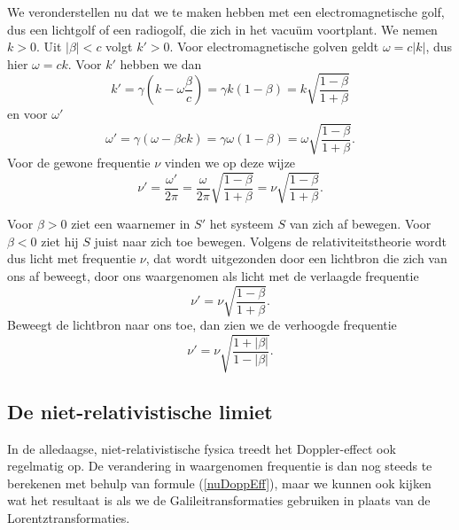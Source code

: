 We veronderstellen nu dat we te maken hebben met een electromagnetische golf, dus een lichtgolf of een radiogolf, die zich in het vacu\"um voortplant. We nemen $k > 0$. Uit $|\beta| < c$ volgt $k' > 0$. Voor electromagnetische golven geldt $\omega = c|k|$, dus hier $\omega = ck$. Voor $k'$ hebben we dan 
%
\begin{equation}
k' = \gamma (k - \omega \frac{\beta}{c}) = \gamma k (1 - \beta) = k \sqrt{\frac{1 - \beta}{1 + \beta}}
\end{equation}
%
en voor $\omega'$
%
\begin{equation}
\omega' = \gamma (\omega - \beta c k) = \gamma \omega (1 - \beta) = \omega \sqrt{\frac{1 - \beta}{1 + \beta}} .
\end{equation}
%
Voor de gewone frequentie $\nu$ vinden we op deze wijze 
%
\begin{equation}
\nu' = \frac{\omega'}{2\pi} = \frac{\omega}{2\pi}\sqrt{\frac{1 - \beta}{1 + \beta}} = \nu \sqrt{\frac{1 - \beta}{1 + \beta}}.
\end{equation}
%

Voor $\beta > 0$ ziet een waarnemer in $S'$ het systeem $S$ van zich af bewegen. Voor $\beta < 0$ ziet hij $S$ juist naar zich toe bewegen. Volgens de relativiteitstheorie wordt dus licht met frequentie $\nu$, dat wordt uitgezonden door een lichtbron die zich van ons af beweegt, door ons waargenomen als licht met de verlaagde frequentie
%
\begin{equation} \label{nuDoppEff}
\nu' = \nu  \sqrt{\frac{1 - \beta}{1 + \beta}}.
\end{equation}
%
Beweegt de lichtbron naar ons toe, dan zien we de verhoogde frequentie 
%
\begin{equation} \label{e:doppler}
\nu' = \nu  \sqrt{\frac{1 + |\beta|}{1 - |\beta|}}.
\end{equation}
%

\subsection{De niet-relativistische limiet}

In de alledaagse, niet-relativistische fysica treedt het
Doppler-effect ook regelmatig op. De verandering in waargenomen
frequentie is dan nog steeds te berekenen met behulp van formule
(\ref{nuDoppEff}), maar we kunnen ook kijken wat het resultaat is als
we de Galileitransformaties gebruiken in plaats van de Lorentztransformaties.

